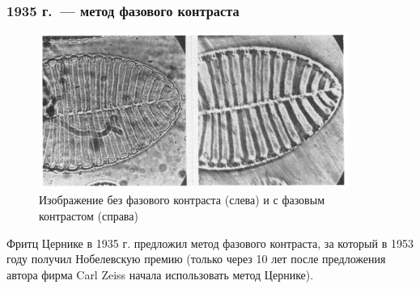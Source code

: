 \documentclass[9pt, compress, xcolor=table]{beamer}
\begin{document}
\begin{frame}[fragile]
\frametitle{1935 г.~--- метод фазового контраста}
\begin{figure}
\centering
\includegraphics[width=0.9\textwidth]{ph_c}
\\ Изображение без фазового контраста (слева) и с фазовым контрастом (справа)
\end{figure}

\alert{Фритц Цернике}  в 1935 г. предложил метод фазового контраста, за который в 1953 году получил Нобелевскую премию (только через 10 лет после предложения автора фирма Carl Zeiss начала использовать метод Цернике).

\end{frame}
\end{document}
